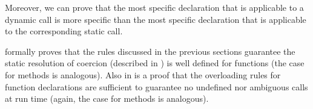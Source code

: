 Moreover, we can prove that the most specific declaration that is
applicable to a dynamic call is more specific than the most specific
declaration that is applicable to the corresponding static call.

 formally proves that
the rules discussed in the previous sections guarantee the static resolution of
coercion (described in ) is well defined
for functions (the case for methods is analogous).  Also in
 is a proof that
the overloading rules for
 function declarations are sufficient to guarantee no
undefined nor ambiguous calls at run time (again,
the case for methods is analogous).
